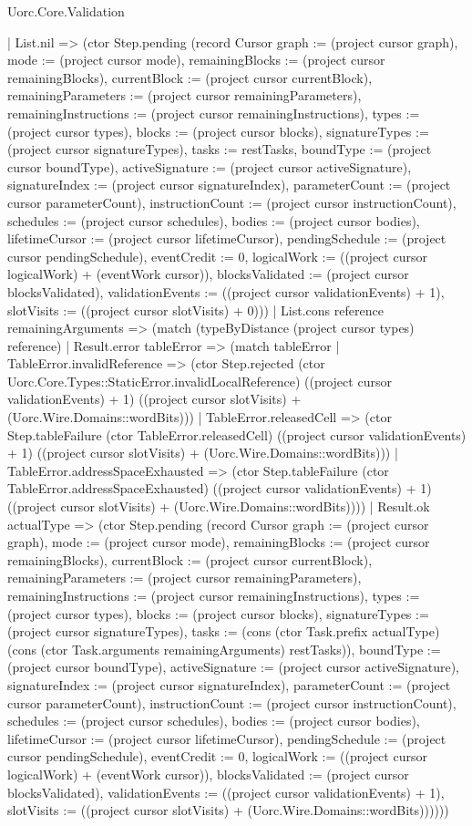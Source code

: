 \begin{lexlean}{Uorc.Core.Validation}
\begin{semanticmodule}
{        | List.nil => (ctor Step.pending (record Cursor {graph := (project cursor graph), mode := (project cursor mode), remainingBlocks := (project cursor remainingBlocks), currentBlock := (project cursor currentBlock), remainingParameters := (project cursor remainingParameters), remainingInstructions := (project cursor remainingInstructions), types := (project cursor types), blocks := (project cursor blocks), signatureTypes := (project cursor signatureTypes), tasks := restTasks, boundType := (project cursor boundType), activeSignature := (project cursor activeSignature), signatureIndex := (project cursor signatureIndex), parameterCount := (project cursor parameterCount), instructionCount := (project cursor instructionCount), schedules := (project cursor schedules), bodies := (project cursor bodies), lifetimeCursor := (project cursor lifetimeCursor), pendingSchedule := (project cursor pendingSchedule), eventCredit := 0, logicalWork := ((project cursor logicalWork) + (eventWork cursor)), blocksValidated := (project cursor blocksValidated), validationEvents := ((project cursor validationEvents) + 1), slotVisits := ((project cursor slotVisits) + 0)}))
        | List.cons reference remainingArguments => (match (typeByDistance (project cursor types) reference)
          | Result.error tableError => (match tableError
            | TableError.invalidReference => (ctor Step.rejected (ctor Uorc.Core.Types::StaticError.invalidLocalReference) ((project cursor validationEvents) + 1) ((project cursor slotVisits) + (Uorc.Wire.Domains::wordBits)))
            | TableError.releasedCell => (ctor Step.tableFailure (ctor TableError.releasedCell) ((project cursor validationEvents) + 1) ((project cursor slotVisits) + (Uorc.Wire.Domains::wordBits)))
            | TableError.addressSpaceExhausted => (ctor Step.tableFailure (ctor TableError.addressSpaceExhausted) ((project cursor validationEvents) + 1) ((project cursor slotVisits) + (Uorc.Wire.Domains::wordBits))))
          | Result.ok actualType => (ctor Step.pending (record Cursor {graph := (project cursor graph), mode := (project cursor mode), remainingBlocks := (project cursor remainingBlocks), currentBlock := (project cursor currentBlock), remainingParameters := (project cursor remainingParameters), remainingInstructions := (project cursor remainingInstructions), types := (project cursor types), blocks := (project cursor blocks), signatureTypes := (project cursor signatureTypes), tasks := (cons (ctor Task.prefix actualType) (cons (ctor Task.arguments remainingArguments) restTasks)), boundType := (project cursor boundType), activeSignature := (project cursor activeSignature), signatureIndex := (project cursor signatureIndex), parameterCount := (project cursor parameterCount), instructionCount := (project cursor instructionCount), schedules := (project cursor schedules), bodies := (project cursor bodies), lifetimeCursor := (project cursor lifetimeCursor), pendingSchedule := (project cursor pendingSchedule), eventCredit := 0, logicalWork := ((project cursor logicalWork) + (eventWork cursor)), blocksValidated := (project cursor blocksValidated), validationEvents := ((project cursor validationEvents) + 1), slotVisits := ((project cursor slotVisits) + (Uorc.Wire.Domains::wordBits))}))))
}
\end{semanticmodule}
\end{lexlean}
